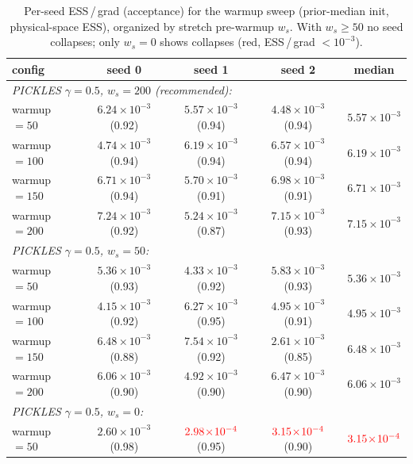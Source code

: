 \documentclass{article}
\begin{document}
\begin{table}[h]
\centering
\caption{Per-seed ESS\,/\,grad (acceptance) for the warmup sweep
(prior-median init, physical-space ESS), organized by stretch pre-warmup
$w_s$. With $w_s\!\ge\!50$ no seed collapses; only $w_s{=}0$ shows
collapses (red, ESS\,/\,grad $<\!10^{-3}$).}
\label{tab:desPerSeedWarmupSweep}
\small
\setlength{\tabcolsep}{3pt}
\begin{tabular}{l c c c c}
\toprule
config & seed 0 & seed 1 & seed 2 & median \\
\midrule
\multicolumn{5}{l}{\emph{PICKLES $\gamma=0.5$, $w_s=200$ (recommended):}} \\
\quad warmup $=50$  & $6.24\!\times\!10^{-3}$ (0.92) & $5.57\!\times\!10^{-3}$ (0.94) & $4.48\!\times\!10^{-3}$ (0.94) & $5.57\!\times\!10^{-3}$ \\
\quad warmup $=100$ & $4.74\!\times\!10^{-3}$ (0.94) & $6.19\!\times\!10^{-3}$ (0.94) & $6.57\!\times\!10^{-3}$ (0.94) & $6.19\!\times\!10^{-3}$ \\
\quad warmup $=150$ & $6.71\!\times\!10^{-3}$ (0.94) & $5.70\!\times\!10^{-3}$ (0.91) & $6.98\!\times\!10^{-3}$ (0.91) & $6.71\!\times\!10^{-3}$ \\
\quad warmup $=200$ & $7.24\!\times\!10^{-3}$ (0.92) & $5.24\!\times\!10^{-3}$ (0.87) & $7.15\!\times\!10^{-3}$ (0.93) & $7.15\!\times\!10^{-3}$ \\
\multicolumn{5}{l}{\emph{PICKLES $\gamma=0.5$, $w_s=50$:}} \\
\quad warmup $=50$  & $5.36\!\times\!10^{-3}$ (0.93) & $4.33\!\times\!10^{-3}$ (0.92) & $5.83\!\times\!10^{-3}$ (0.93) & $5.36\!\times\!10^{-3}$ \\
\quad warmup $=100$ & $4.15\!\times\!10^{-3}$ (0.92) & $6.27\!\times\!10^{-3}$ (0.95) & $4.95\!\times\!10^{-3}$ (0.91) & $4.95\!\times\!10^{-3}$ \\
\quad warmup $=150$ & $6.48\!\times\!10^{-3}$ (0.88) & $7.54\!\times\!10^{-3}$ (0.92) & $2.61\!\times\!10^{-3}$ (0.85) & $6.48\!\times\!10^{-3}$ \\
\quad warmup $=200$ & $6.06\!\times\!10^{-3}$ (0.90) & $4.92\!\times\!10^{-3}$ (0.90) & $6.47\!\times\!10^{-3}$ (0.90) & $6.06\!\times\!10^{-3}$ \\
\multicolumn{5}{l}{\emph{PICKLES $\gamma=0.5$, $w_s=0$:}} \\
\quad warmup $=50$  & $2.60\!\times\!10^{-3}$ (0.98) & $\textcolor{red}{2.98\!\times\!10^{-4}}$ (0.95) & $\textcolor{red}{3.15\!\times\!10^{-4}}$ (0.90) & $\textcolor{red}{3.15\!\times\!10^{-4}}$ \\

\end{tabular}
\end{table}
\end{document}
